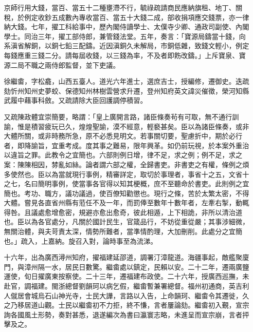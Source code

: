 \begin{pinyinscope}
京師行用大錢，當百、當五十二種壅滯不行，毓祿疏請商民應納旗租、地丁、關稅，於例定收鈔五成數內專收當百、當五十大錢二成，部收捐項應交錢票，亦一律納大錢。七年，擢工科給事中，歷內閣侍讀學士、太僕寺少卿、通政司副使、內閣學士。同治三年，擢工部侍郎，兼管錢法堂。五年，奏言：「寶源局鑄當十錢，向系滇省解銅，以銅七鉛三配鑄。近因滇銅久未解局，市銅低雜，致錢文輕小，例定每錢應重三錢二分。請每屆收錢，以三錢為率，不及者即飭改鑄。」上斥寶泉、寶源二局不職之兩侍郎監督，並下吏議。

徐繼畬，字松龕，山西五臺人。道光六年進士，選庶吉士，授編修，遷御史。迭疏劾忻州知州史夢蛟、保德知州林樹雲營求升遷，登州知府英文諱災催徵，榮河知縣武履中藉事科斂。又疏請除大臣回護調停積習。

又疏陳政體宜崇簡要，略謂：「皇上廣開言路，諸臣條奏茍有可取，無不通行訓諭，惟是積習疲玩已久，煌煌聖諭，漠不經意，輕褻甚矣。臣以為諸臣條奏，或非大體所關，或非時務所急，原不必悉見明文。若事關切要，聖慮折中，期於必行者，即降諭旨，宜重考成。度其事之難易，限年興革。如仍前玩視，於本案外重治以違旨之罪。此教令之宜簡也。六部則例日增，律不足，求之例；例不足，求之案：陳陳相因，棼亂如絲。論者謂六部之權，全歸書吏。非書吏之有權，條例之煩多使然也。臣以為當就現行事例，精審詳定，取切於事理者，事省十之五，文省十之七，名曰簡明事例，使當事各官得以知其梗概，庶不至聽命於書吏。此則例之宜簡也。考功、職方，議功議過，使百僚知勸懲也。現行之條，苦於太繁太密，不得大體。嘗見各直省州縣有蒞任不及一年，而罰俸至數年十數年者，左牽右掣，動輒得咎。且議處愈增愈密，規避亦愈出愈奇，彼此相遁，上下相詭，非所以清治道也。臣以為各官處分，凡關於國計民生，官箴品行，不妨從重從嚴；其事涉細微，無關治體，與夫苛責太深，情勢所難者，當準情酌理，大加刪削。此處分之宜簡也。」疏入，上嘉納。旋召入對，論時事至為流涕。

十六年，出為廣西潯州知府，擢福建延邵道，調署汀漳龍道。海疆事起，敵艦聚廈門，與漳州隔一水，居民日數驚。繼畬處以鎮定，民賴以安。二十二年，遷兩廣鹽運使，旬日擢廣東按察使。二十三年，遷福建布政使。二十六年，授廣西巡撫，未赴官，調福建。閩浙總督劉韻珂以病乞假，繼畬暫兼署總督。福州初通商，英吉利人僦居會城烏石山神光寺，士民大譁，言路以入告，上命韻珂、繼畬令其遷徙，久之乃移居道山觀。士民以繼畬初不力拒，終不慊，言者屢論劾。繼畬初入覲，宣宗詢各國風土形勢，奏對甚悉，退遂編次為書曰瀛寰志略，未進呈而宣宗崩，言者抨擊及之。


\end{pinyinscope}
